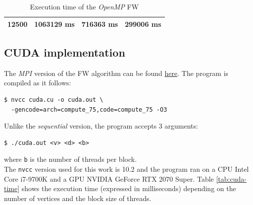 \begin{table}[h!]
\begin{tabular}{|r|r|r|r|}
12500                                                                                  & 1063129 ms                                                                                     & 716363 ms                                                                                       & 299006 ms                                                                                       \\ \hline
\end{tabular}
\caption{Execution time of the \emph{OpenMP} FW}                                                                                                                                            
\label{tab:omp-time}
\end{table}

\subsection{CUDA implementation}
The \emph{MPI} version of the FW algorithm can be found \href{https://github.com/firaja/Parallel-FloydWarshall/blob/master/cuda.c}{here}. 
The program is compiled as it follows:
\begin{lstlisting}[basicstyle=\footnotesize\ttfamily]
$ nvcc cuda.cu -o cuda.out \
  -gencode=arch=compute_75,code=compute_75 -O3
\end{lstlisting}
Unlike the \emph{sequential} version, the program accepts 3 arguments:
\begin{lstlisting}[basicstyle=\footnotesize\ttfamily]
$ ./cuda.out <v> <d> <b>
\end{lstlisting}
where \texttt{b} is the number of threads per block. \\
The \texttt{nvcc} version used for this work is 10.2 and the program ran on a CPU Intel Core i7-9700K and a GPU NVIDIA GeForce RTX 2070 Super.
Table \ref*{tab:cuda-time} shows the execution time (expressed in milliseconds) depending on the number of vertices and the block size of threads.

